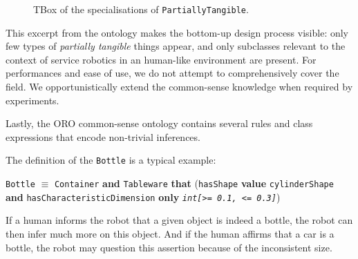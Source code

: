 \documentclass[preprint,3p,times]{elsarticle}
\newcommand{\concept}[1]{{\small \texttt{#1}}}
\begin{document}
\begin{figure}
    \centering

    \caption{TBox of the specialisations of \concept{PartiallyTangible}.}
    \label{fig|tangible_things_tbox}
\end{figure}

This excerpt from the ontology makes the bottom-up design process visible: only
few types of \emph{partially tangible} things appear, and only subclasses
relevant to the context of service robotics in an human-like environment are
present. For performances and ease of use, we do not attempt to comprehensively
cover the field. We opportunistically extend the common-sense knowledge when
required by experiments.

Lastly, the ORO common-sense ontology contains several rules and class
expressions that encode non-trivial inferences.

The definition of the \concept{Bottle} is a typical example:

\concept{Bottle} $\equiv$ \concept{Container} {\bf and} \concept{Tableware}
{\bf that} (\concept{hasShape} {\bf value} \concept{cylinderShape} {\bf and}
\concept{hasCharacteristicDimension} {\bf only} \concept{\em int[>= 0.1, <=
0.3]})

If a human informs the robot that a given object is indeed a bottle, the robot
can then infer much more on this object. And if the human affirms that a car is
a bottle, the robot may question this assertion because of the inconsistent
size.
\end{document}
